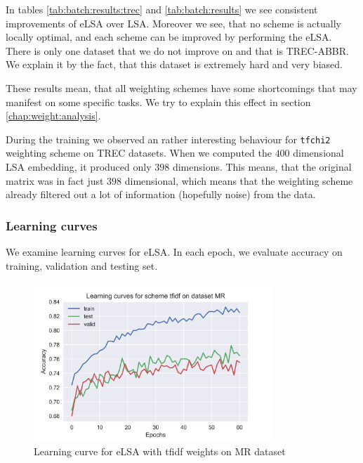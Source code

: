     

    In tables \ref{tab:batch:results:trec} and \ref{tab:batch:results} we see consistent improvements of eLSA over LSA.
    Moreover we see, that no scheme is actually locally optimal, and each scheme can be improved by performing the eLSA.
    There is only one dataset that we do not improve on and that is TREC-ABBR.
    We explain it by the fact, that this dataset is extremely hard and very biased. 
    
    These results mean, that all weighting schemes have some shortcomings 
    that may manifest on some specific tasks.  
    We try to explain this effect in section \ref{chap:weight:analysis}.
    
    During the training we observed an rather interesting behaviour for \texttt{tfchi2} weighting scheme on TREC datasets.
    When we computed the $400$ dimensional LSA embedding, it produced only $398$ dimensions. 
    This means, that the original matrix was in fact just $398$ dimensional, 
    which means that the weighting scheme already filtered out a lot of information (hopefully noise) from the data. 

    \subsubsection{Learning curves}
    We examine learning curves for eLSA.
    In each epoch, we evaluate accuracy on training, validation and testing set.
    
    \begin{figure}
    \centerline{\includegraphics[width=0.8\textwidth]{images/learning_curve_MR_tfidf}}
    \caption[Learning curve for eLSA with tfidf weights on MR dataset]{Learning curve for eLSA with tfidf weights on MR dataset}
    \label{img:learning:curve}
    \end{figure}

